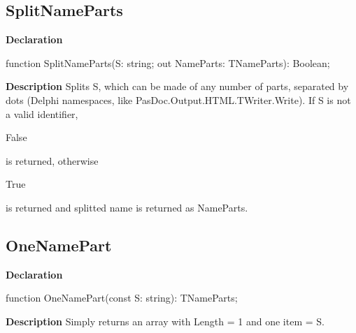 \documentclass{report}
\newif\ifpdf
\begin{document}
\subsection*{SplitNameParts}
\fi
\label{PasDoc_Types-SplitNameParts}
\begin{list}{}{
\setlength{\itemindent}{0cm}
\setlength{\listparindent}{0cm}
\setlength{\leftmargin}{\evensidemargin}
\addtolength{\leftmargin}{\tmplength}
\settowidth{\labelsep}{X}
\addtolength{\leftmargin}{\labelsep}
\setlength{\labelwidth}{\tmplength}
}
\item[\textbf{Declaration}\hfill]
\ifpdf
\begin{flushleft}
\fi
\begin{ttfamily}
function SplitNameParts(S: string; out NameParts: TNameParts): Boolean;\end{ttfamily}

\ifpdf
\end{flushleft}
\fi

\par
\item[\textbf{Description}]
Splits S, which can be made of any number of parts, separated by dots (Delphi namespaces, like PasDoc.Output.HTML.TWriter.Write). If S is not a valid identifier, \begin{ttfamily}False\end{ttfamily} is returned, otherwise \begin{ttfamily}True\end{ttfamily} is returned and splitted name is returned as NameParts.

\end{list}
\ifpdf
\subsection*{\large{\textbf{OneNamePart}}\normalsize\hspace{1ex}\hrulefill}
\else
\subsection*{OneNamePart}
\fi
\label{PasDoc_Types-OneNamePart}
\begin{list}{}{
\setlength{\itemindent}{0cm}
\setlength{\listparindent}{0cm}
\setlength{\leftmargin}{\evensidemargin}
\addtolength{\leftmargin}{\tmplength}
\settowidth{\labelsep}{X}
\addtolength{\leftmargin}{\labelsep}
\setlength{\labelwidth}{\tmplength}
}
\item[\textbf{Declaration}\hfill]
\ifpdf
\begin{flushleft}
\fi
\begin{ttfamily}
function OneNamePart(const S: string): TNameParts;\end{ttfamily}

\ifpdf
\end{flushleft}
\fi

\par
\item[\textbf{Description}]
Simply returns an array with Length = 1 and one item = S.

\end{list}
\ifpdf
\end{document}
